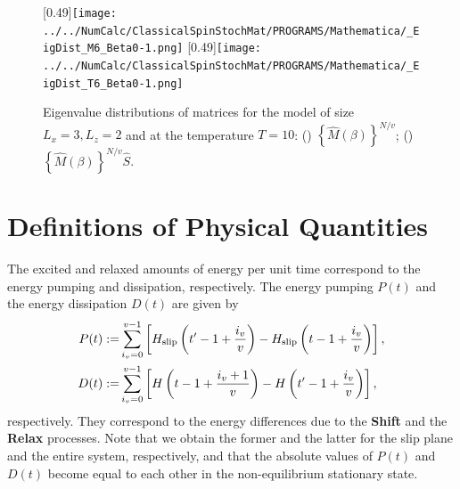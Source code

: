 \begin{figure}[htbp]
	\centering
	\subcaptionbox{\label{fig:EigDistM6}}[0.49\linewidth]{\texttt{[image: ../../NumCalc/ClassicalSpinStochMat/PROGRAMS/Mathematica/\_EigDist\_M6\_Beta0-1.png]}}
	\subcaptionbox{\label{fig:EigDistT6}}[0.49\linewidth]{\texttt{[image: ../../NumCalc/ClassicalSpinStochMat/PROGRAMS/Mathematica/\_EigDist\_T6\_Beta0-1.png]}}
	
	\caption{Eigenvalue distributions of matrices for the model of size $L_{x}=3, L_{z}=2$ and at the temperature $T=10$:  () $\left\{\hat{M}(\beta)\right\}^{N/v}$; () $\left\{\hat{M}(\beta)\right\}^{N/v}\hat{S}$.}
	\label{fig:EigDist}
\end{figure}

\section{Definitions of Physical Quantities}\label{sec:defquan}
The excited and relaxed amounts of energy per unit time correspond to the energy pumping and dissipation, respectively. The energy pumping $P(t)$ and the energy dissipation $D(t)$ are given by
\begin{align}
P(t):=&\sum_{i_{v}=0}^{v-1}\left[ H_{\rm slip}\left(t'-1+\frac{i_{v}}{v}\right) - H_{\rm slip}\left(t-1+\frac{i_{v}}{v}\right)\right]\label{def:Pump},\\
D(t):=&\sum_{i_{v}=0}^{v-1}\left[ H\left(t-1+\frac{i_{v}+1}{v}\right) - H\left(t'-1+\frac{i_{v}}{v}\right)\right]\label{def:Diss},
\end{align}
respectively. They correspond to the energy differences due to the \textbf{Shift} and the \textbf{Relax} processes. Note that we obtain the former and the latter for the slip plane and the entire system, respectively, and that the absolute values of $P(t)$ and $D(t)$ become equal to each other in the non-equilibrium stationary state.

